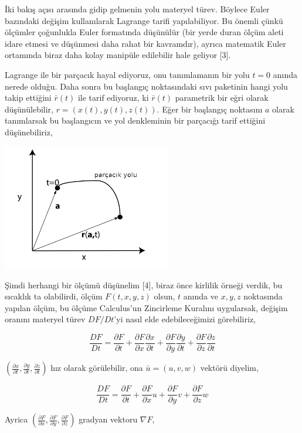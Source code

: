 \documentclass[12pt,fleqn]{article}\usepackage{../../common}
\begin{document}
İki bakış açısı arasında gidip gelmenin yolu materyel türev. Böylece Euler
bazındaki değişim kullanılarak Lagrange tarifi yapılabiliyor. Bu önemli çünkü
ölçümler çoğunlukla Euler formatında düşünülür (bir yerde duran ölçüm aleti
idare etmesi ve düşünmesi daha rahat bir kavramdır), ayrıca matematik Euler
ortamında biraz daha kolay manipüle edilebilir hale geliyor [3].

Lagrange ile bir parçacık hayal ediyoruz, onu tanımlamanın bir yolu $t=0$ anında
nerede olduğu. Daha sonra bu başlangıç noktasındaki sıvı paketinin hangi yolu
takip ettiğini $\bar{r}(t)$ ile tarif ediyoruz, ki $\bar{r}(t)$ parametrik bir
eğri olarak düşünülebilir, $r = ( x(t), y(t), z(t) )$. Eğer bir başlangıç
noktasını $a$ olarak tanımlarsak bu başlangıcın ve yol denkleminin bir parçacığı
tarif ettiğini düşünebiliriz,

\includegraphics[width=20em]{phy_050_fluid_01.png}

Şimdi herhangi bir ölçümü düşünelim [4], biraz önce kirlilik örneği verdik, bu
sıcaklık ta olabilirdi, ölçüm $F(t,x,y,z)$ olsun, $t$ anında ve $x,y,z$
noktasında yapılan ölçüm, bu ölçüme Calculus'un Zincirleme Kuralını uygularsak,
değişim oranını materyel türev $D F / Dt$'yi nasıl elde edebileceğimizi
görebiliriz,

$$
\frac{D F}{D t} =
\frac{\partial F}{\partial t} +
\frac{\partial F}{\partial x} \frac{\partial x}{\partial t} + 
\frac{\partial F}{\partial y} \frac{\partial y}{\partial t} + 
\frac{\partial F}{\partial z} \frac{\partial z}{\partial t} 
$$

$(\frac{\partial x}{\partial t}, \frac{\partial y}{\partial t},\frac{\partial
z}{\partial t})$ hız olarak görülebilir, ona $\bar{u} = (u,v,w)$ vektörü diyelim,

$$
\frac{D F}{D t} =
\frac{\partial F}{\partial t} +
\frac{\partial F}{\partial x} u + 
\frac{\partial F}{\partial y} v + 
\frac{\partial F}{\partial z} w 
$$

Ayrica $(\frac{\partial F}{\partial x},\frac{\partial F}{\partial y},\frac{\partial F}{\partial z})$
gradyan vektoru $\nabla F$,
\end{document}
